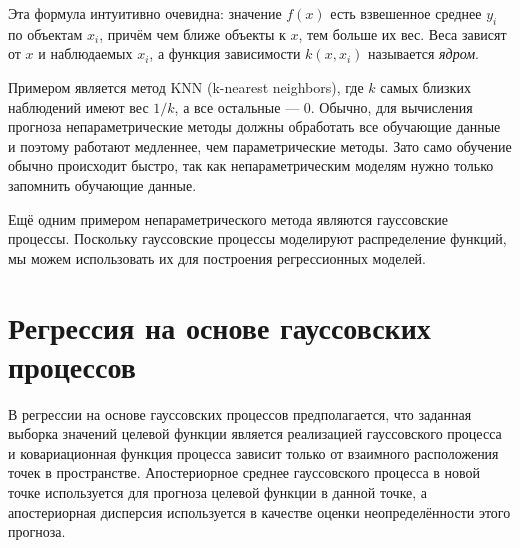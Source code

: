 \documentclass[11pt,a4paper]{article}
\begin{document}
Эта формула интуитивно очевидна: значение \(f(x)\) есть взвешенное
среднее \(y_i\) по объектам \(x_i\), причём чем ближе объекты к \(x\),
тем больше их вес. Веса зависят от \(x\) и наблюдаемых \(x_i\), а
функция зависимости \(k(x, x_i)\) называется \emph{ядром}.

    Примером является метод KNN (k-nearest neighbors), где \(k\) самых
близких наблюдений имеют вес \(1/k\), а все остальные --- \(0\). Обычно,
для вычисления прогноза непараметрические методы должны обработать все
обучающие данные и поэтому работают медленнее, чем параметрические
методы. Зато само обучение обычно происходит быстро, так как
непараметрическим моделям нужно только запомнить обучающие данные.

Ещё одним примером непараметрического метода являются гауссовские
процессы. Поскольку гауссовские процессы моделируют распределение
функций, мы можем использовать их для построения регрессионных моделей.


    \begin{center}
    \end{center}
    

    \hypertarget{ux440ux435ux433ux440ux435ux441ux441ux438ux44f-ux43dux430-ux43eux441ux43dux43eux432ux435-ux433ux430ux443ux441ux441ux43eux432ux441ux43aux438ux445-ux43fux440ux43eux446ux435ux441ux441ux43eux432}{%
\section{Регрессия на основе гауссовских
процессов}\label{ux440ux435ux433ux440ux435ux441ux441ux438ux44f-ux43dux430-ux43eux441ux43dux43eux432ux435-ux433ux430ux443ux441ux441ux43eux432ux441ux43aux438ux445-ux43fux440ux43eux446ux435ux441ux441ux43eux432}}

    В регрессии на основе гауссовских процессов предполагается, что заданная
выборка значений целевой функции является реализацией гауссовского
процесса и ковариационная функция процесса зависит только от взаимного
расположения точек в пространстве. Апостериорное среднее гауссовского
процесса в новой точке используется для прогноза целевой функции в
данной точке, а апостериорная дисперсия используется в качестве оценки
неопределённости этого прогноза.
\end{document}
